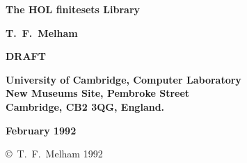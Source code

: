 
\begin{titlepage}

\setcounter{page}{1}		          %


\mbox{}
\vskip20mm
\begin{center}
{\Huge\bf The HOL finite{\und}sets Library}
\end{center}


\vskip15mm
\begin{center}
\large\bf T.\ F.\ Melham
\end{center}


\vfill

\begin{center} \LARGE\bf DRAFT \end{center}

\vfill
\begin{center}
\bf
University of Cambridge, Computer Laboratory\\
New Museums Site, Pembroke Street\\
Cambridge, {\small\bf CB}2 3{\small\bf QG}, England.
\end{center}


\vskip5mm
\begin{center}
\bf February 1992
\end{center}

\end{titlepage}

\thispagestyle{empty}
\mbox{}

\vfill
\begin{center}
\copyright\ T.\ F.\ Melham 1992
\end{center}
\newpage
